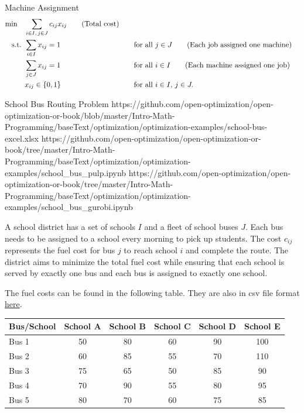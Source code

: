 \begin{examplewithallcode}{Machine Assignment}
\begin{align*}
\min \quad & \sum_{i \in I,\, j \in J} c_{ij} x_{ij}   \tag{Total cost} \\
\text{ s.t. }        & \sum_{i \in I} x_{ij} = 1 &&\quad \text{for all } j \in J   \tag{Each job assigned one machine} \\
             & \sum_{j \in J} x_{ij} = 1 &&\quad \text{for all } i \in I   \tag{Each machine assigned one job} \\
             & x_{ij} \in \{0,1\} &&\quad \text{for all } i \in I,\, j \in J.
\end{align*}
\end{examplewithallcode}

\begin{examplewithallcode}{School Bus Routing Problem}
{https://github.com/open-optimization/open-optimization-or-book/blob/master/Intro-Math-Programming/baseText/optimization/optimization-examples/school-bus-excel.xlsx}
{https://github.com/open-optimization/open-optimization-or-book/tree/master/Intro-Math-Programming/baseText/optimization/optimization-examples/school_bus_pulp.ipynb}
{https://github.com/open-optimization/open-optimization-or-book/tree/master/Intro-Math-Programming/baseText/optimization/optimization-examples/school_bus_gurobi.ipynb}

A school district has a set of schools \( I \) and a fleet of school buses \( J \). Each bus needs to be assigned to a school every morning to pick up students. The cost \( c_{ij} \) represents the fuel cost for bus \( j \) to reach school \( i \) and complete the route. The district aims to minimize the total fuel cost while ensuring that each school is served by exactly one bus and each bus is assigned to exactly one school.

The fuel costs can be found in the following table.  They are also in csv file format \href{https://github.com/open-optimization/open-optimization-or-examples/blob/master/integer-programming/school_bus_data.csv}{here}.
\begin{tabular}{l|ccccc}
\toprule
Bus/School & School A & School B & School C & School D & School E \\
\midrule
Bus 1 & 50 & 80 & 60 & 90 & 100 \\
Bus 2 & 60 & 85 & 55 & 70 & 110 \\
Bus 3 & 75 & 65 & 50 & 85 & 90 \\
Bus 4 & 70 & 90 & 55 & 80 & 95 \\
Bus 5 & 80 & 70 & 60 & 75 & 85 \\
\bottomrule
\end{tabular}
\par{}\label{tab:modeling-sums-tab03}%



\end{examplewithallcode}
